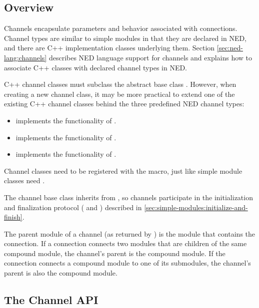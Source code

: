 \subsection{Overview}
\label{sec:simple-modules:channels-overview}

Channels encapsulate parameters and behavior associated with connections.
Channel types are similar to simple modules in that they are declared
in NED, and there are C++ implementation classes underlying them. Section
\ref{sec:ned-lang:channels} describes NED language support for channels
and explains how to associate C++ classes with declared channel types in
NED.

C++ channel classes must subclass the abstract base class
. However, when creating a new channel class, it may be
more practical to extend one of the existing C++ channel classes behind the
three predefined NED channel types:

\begin{itemize}
  \item {} implements the functionality of .
  \item {} implements the functionality of .
  \item {} implements the functionality of .
\end{itemize}

Channel classes need to be registered with the  macro,
just like simple module classes need .

The channel base class  inherits from ,
so channels participate in the initialization and finalization protocol
( and ) described in
\ref{sec:simple-modules:initialize-and-finish}.

The parent module of a channel (as returned by
) is the module that contains
the connection. If a connection connects two modules that are children of
the same compound module, the channel's parent is the compound module. If
the connection connects a compound module to one of its submodules, the
channel's parent is also the compound module.


\subsection{The Channel API}
\label{sec:simple-modules:channel-api}

